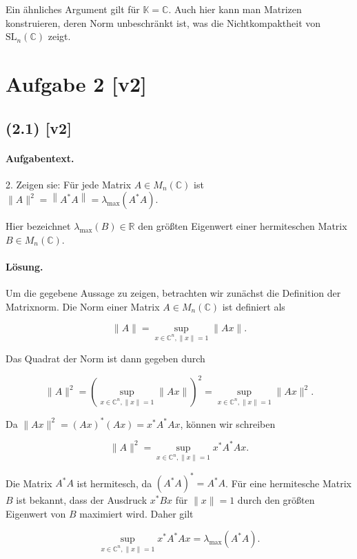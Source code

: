 \documentclass[11pt,a4paper]{article}
\begin{document}
Ein ähnliches Argument gilt für $\mathbb{K} = \mathbb{C}$. Auch hier kann man Matrizen konstruieren, deren Norm unbeschränkt ist, was die Nichtkompaktheit von $\mathrm{SL}_n(\mathbb{C})$ zeigt.


\section*{Aufgabe 2 [v2]}
\subsection*{(2.1) [v2]}
\paragraph{Aufgabentext.}
2. Zeigen sie: Für jede Matrix $A \in M_n(\mathbb{C})$ ist $\|A\|^2=\left\|A^* A\right\|=\lambda_{\max }\left(A^* A\right)$.

Hier bezeichnet $\lambda_{\max }(B) \in \mathbb{R}$ den größten Eigenwert einer hermiteschen Matrix $B \in M_n(\mathbb{C})$.

\paragraph{Lösung.}
Um die gegebene Aussage zu zeigen, betrachten wir zunächst die Definition der Matrixnorm. Die Norm einer Matrix \( A \in M_n(\mathbb{C}) \) ist definiert als

\[
\|A\| = \sup_{x \in \mathbb{C}^n, \|x\| = 1} \|Ax\|.
\]

Das Quadrat der Norm ist dann gegeben durch

\[
\|A\|^2 = \left( \sup_{x \in \mathbb{C}^n, \|x\| = 1} \|Ax\| \right)^2 = \sup_{x \in \mathbb{C}^n, \|x\| = 1} \|Ax\|^2.
\]

Da \(\|Ax\|^2 = (Ax)^* (Ax) = x^* A^* A x\), können wir schreiben

\[
\|A\|^2 = \sup_{x \in \mathbb{C}^n, \|x\| = 1} x^* A^* A x.
\]

Die Matrix \(A^* A\) ist hermitesch, da \((A^* A)^* = A^* A\). Für eine hermitesche Matrix \(B\) ist bekannt, dass der Ausdruck \(x^* B x\) für \(\|x\| = 1\) durch den größten Eigenwert von \(B\) maximiert wird. Daher gilt

\[
\sup_{x \in \mathbb{C}^n, \|x\| = 1} x^* A^* A x = \lambda_{\max}(A^* A).
\]
\end{document}
